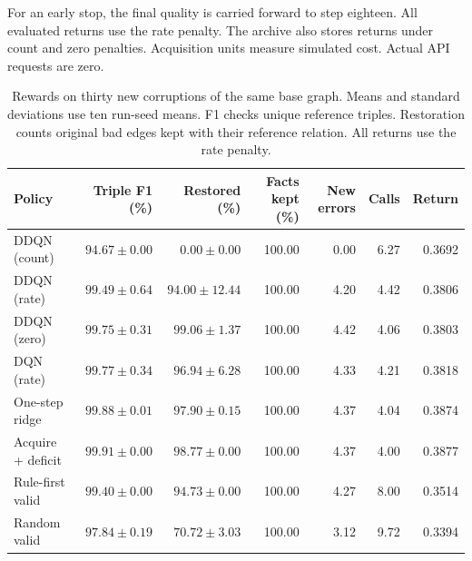 For an early stop, the final quality is carried forward to step eighteen.
All evaluated returns use the rate penalty. The archive also stores returns
under count and zero penalties. Acquisition units measure simulated cost.
Actual API requests are zero.

\begin{table}[t]
\centering
\caption{Rewards on thirty new corruptions of the same base graph. Means and standard deviations use ten run-seed means. F1 checks unique reference triples. Restoration counts original bad edges kept with their reference relation. All returns use the rate penalty.}
\label{tab:reward_validation}
\footnotesize
\setlength{\tabcolsep}{3pt}
\begin{tabular*}{\textwidth}{@{\extracolsep{\fill}}lrrrrrr@{}}
\toprule
Policy & Triple F1 (\%) & Restored (\%) & Facts kept (\%) & New errors & Calls & Return \\
\midrule
DDQN (count) & $94.67\pm0.00$ & $0.00\pm0.00$ & 100.00 & 0.00 & 6.27 & 0.3692 \\
DDQN (rate) & $99.49\pm0.64$ & $94.00\pm12.44$ & 100.00 & 4.20 & 4.42 & 0.3806 \\
DDQN (zero) & $99.75\pm0.31$ & $99.06\pm1.37$ & 100.00 & 4.42 & 4.06 & 0.3803 \\
DQN (rate) & $99.77\pm0.34$ & $96.94\pm6.28$ & 100.00 & 4.33 & 4.21 & 0.3818 \\
One-step ridge & $99.88\pm0.01$ & $97.90\pm0.15$ & 100.00 & 4.37 & 4.04 & 0.3874 \\
Acquire + deficit & $99.91\pm0.00$ & $98.77\pm0.00$ & 100.00 & 4.37 & 4.00 & 0.3877 \\
Rule-first valid & $99.40\pm0.00$ & $94.73\pm0.00$ & 100.00 & 4.27 & 8.00 & 0.3514 \\
Random valid & $97.84\pm0.19$ & $70.72\pm3.03$ & 100.00 & 3.12 & 9.72 & 0.3394 \\
\bottomrule
\end{tabular*}
\end{table}



